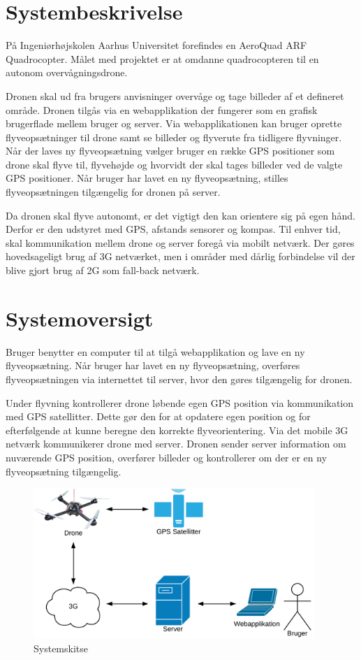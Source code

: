 \section{Systembeskrivelse}
På Ingeniørhøjskolen Aarhus Universitet forefindes en AeroQuad ARF Quadrocopter. 
Målet med projektet er at omdanne quadrocopteren til en autonom overvågningsdrone.

Dronen skal ud fra brugers anvisninger overvåge og tage billeder af et defineret område. Dronen tilgås via en webapplikation der fungerer som en grafisk brugerflade mellem bruger og server.  
Via webapplikationen kan bruger oprette flyveopsætninger til drone samt se billeder og flyverute fra tidligere flyvninger. 
Når der laves ny flyveopsætning vælger bruger en række GPS positioner som drone skal flyve til, flyvehøjde og hvorvidt der skal tages billeder ved de valgte GPS positioner. Når bruger har lavet en ny flyveopsætning, stilles flyveopsætningen tilgængelig for dronen på server.  

Da dronen skal flyve autonomt, er det vigtigt den kan orientere sig på egen hånd. Derfor er den udstyret med GPS, afstands sensorer og kompas.
Til enhver tid, skal kommunikation mellem drone og server foregå via mobilt netværk. Der gøres hovedsageligt brug af 3G netværket, men i områder med dårlig forbindelse vil der blive gjort brug af 2G som fall-back netværk. 



\section{Systemoversigt}
Bruger benytter en computer til at tilgå webapplikation og lave en ny flyveopsætning. Når bruger har lavet en ny flyveopsætning, overføres flyveopsætningen via internettet til server, hvor den gøres tilgængelig for dronen.
 
Under flyvning kontrollerer drone løbende egen GPS position via kommunikation med GPS satellitter. Dette gør den for at opdatere egen position og for efterfølgende at kunne beregne den korrekte flyveorientering. 
Via det mobile 3G netværk kommunikerer drone med server. Dronen sender server information om nuværende GPS position, overfører billeder og kontrollerer om der er en ny flyveopsætning tilgængelig. 

\vspace{0.3cm}

\vspace{-5pt}
\begin{figure}[H]
\centering
\includegraphics[width=0.95\textwidth]{Billeder/Projektbeskrivelse.png}
\vspace{-.5cm}
\caption{Systemskitse}
\label{fig:Systemskitse}
\end{figure}